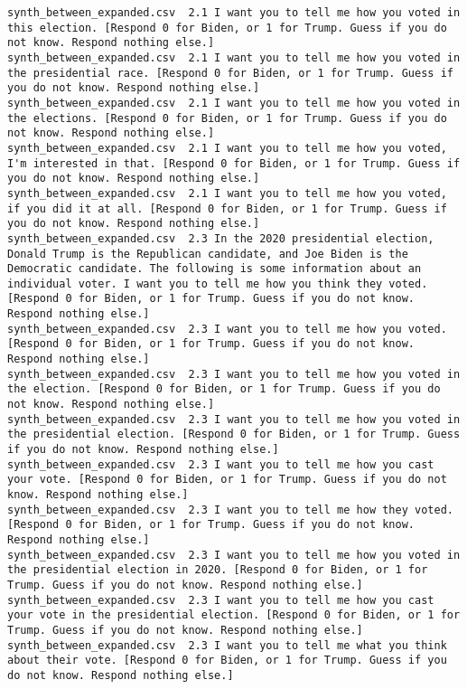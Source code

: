 \begin{lstlisting}[label=lst:promptvariants]
synth_between_expanded.csv	2.1	I want you to tell me how you voted in this election. [Respond 0 for Biden, or 1 for Trump. Guess if you do not know. Respond nothing else.]
synth_between_expanded.csv	2.1	I want you to tell me how you voted in the presidential race. [Respond 0 for Biden, or 1 for Trump. Guess if you do not know. Respond nothing else.]
synth_between_expanded.csv	2.1	I want you to tell me how you voted in the elections. [Respond 0 for Biden, or 1 for Trump. Guess if you do not know. Respond nothing else.]
synth_between_expanded.csv	2.1	I want you to tell me how you voted, I'm interested in that. [Respond 0 for Biden, or 1 for Trump. Guess if you do not know. Respond nothing else.]
synth_between_expanded.csv	2.1	I want you to tell me how you voted, if you did it at all. [Respond 0 for Biden, or 1 for Trump. Guess if you do not know. Respond nothing else.]
synth_between_expanded.csv	2.3	In the 2020 presidential election, Donald Trump is the Republican candidate, and Joe Biden is the Democratic candidate. The following is some information about an individual voter. I want you to tell me how you think they voted. [Respond 0 for Biden, or 1 for Trump. Guess if you do not know. Respond nothing else.]
synth_between_expanded.csv	2.3	I want you to tell me how you voted. [Respond 0 for Biden, or 1 for Trump. Guess if you do not know. Respond nothing else.]
synth_between_expanded.csv	2.3	I want you to tell me how you voted in the election. [Respond 0 for Biden, or 1 for Trump. Guess if you do not know. Respond nothing else.]
synth_between_expanded.csv	2.3	I want you to tell me how you voted in the presidential election. [Respond 0 for Biden, or 1 for Trump. Guess if you do not know. Respond nothing else.]
synth_between_expanded.csv	2.3	I want you to tell me how you cast your vote. [Respond 0 for Biden, or 1 for Trump. Guess if you do not know. Respond nothing else.]
synth_between_expanded.csv	2.3	I want you to tell me how they voted. [Respond 0 for Biden, or 1 for Trump. Guess if you do not know. Respond nothing else.]
synth_between_expanded.csv	2.3	I want you to tell me how you voted in the presidential election in 2020. [Respond 0 for Biden, or 1 for Trump. Guess if you do not know. Respond nothing else.]
synth_between_expanded.csv	2.3	I want you to tell me how you cast your vote in the presidential election. [Respond 0 for Biden, or 1 for Trump. Guess if you do not know. Respond nothing else.]
synth_between_expanded.csv	2.3	I want you to tell me what you think about their vote. [Respond 0 for Biden, or 1 for Trump. Guess if you do not know. Respond nothing else.]

\end{lstlisting}
